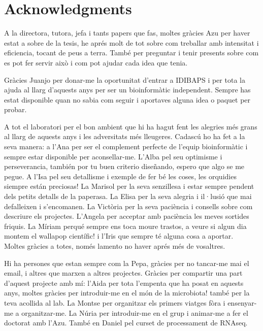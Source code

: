 \documentclass[
  12pt,
  a4paper,
  twoside,
  openright]{book}
\begin{document}
\hypertarget{acknowledgments}{%
\chapter{Acknowledgments}\label{acknowledgments}}

A la directora, tutora, jefa i tants papers que fas, moltes gràcies Azu per haver estat a sobre de la tesis, he aprés molt de tot sobre com treballar amb intensitat i eficiencia, tocant de peus a terra. També per preguntar i tenir presents sobre com es pot fer servir això i com pot ajudar cada idea que tenia.

Gràcies Juanjo per donar-me la oportunitat d'entrar a IDIBAPS i per tota la ajuda al llarg d'aquests anys per ser un bioinformàtic independent. Sempre has estat disponible quan no sabia com seguir i aportaves alguna idea o paquet per probar.

A tot el laboratori per el bon ambient que hi ha hagut fent les alegries més grans al llarg de aquests anys i les adversitats més lleugeres.
Cadascú ho ha fet a la seva manera: a l'Ana per ser el complement perfecte de l'equip bioinformàtic i sempre estar disponible per aconsellar-me.
L'Alba pel seu optimisme i perseverancia, también por tu buen criterio diseñando, espero que algo se me pegue.
A l'Isa pel seu detallisme i exemple de fer bé les coses, les orquidies siempre están preciosas!
La Marisol per la seva senzillesa i estar sempre pendent dels petits detalls de la paperasa.
La Elisa per la seva alegria i il·lusió que mai defalleixen i s'encomanen.
La Victòria per la seva paciència i consells sobre com descriure els projectes.
L'Angela per acceptar amb paciència les meves sortides friquis.
La Míriam perqué sempre ens toca moure trastos, a veure si algun dia montem el wallapop científic! i l'Iris que sempre té alguna cosa a aportar.\\
Moltes gràcies a totes, només lamento no haver aprés més de vosaltres.

Hi ha persones que estan sempre com la Pepa, gràcies per no tancar-me mai el email, i altres que marxen a altres projectes.
Gràcies per compartir una part d'aquest projecte amb mí:
l'Aida per tota l'empenta que ha posat en aquests anys, moltes gràcies per introduir-me en el món de la microbiota! també per la teva acollida al lab. La Montse per organitzar els primers viatges fòra i ensenyar-me a organitzar-me.
La Núria per introduir-me en el grup i animar-me a fer el doctorat amb l'Azu.
També en Daniel pel curset de processament de RNAseq.
\end{document}

